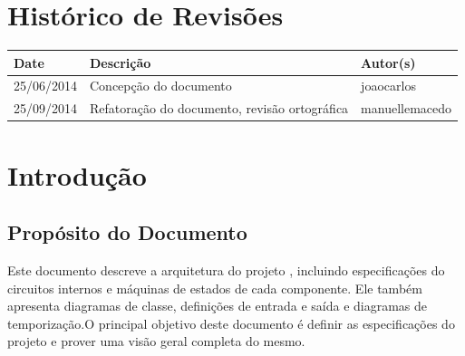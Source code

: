 \documentclass{report}
\begin{document}
\capa
%

\chapter*{Histórico de Revisões}
  \vspace*{1cm}
  \begin{table}[ht]
    \centering
    \begin{tabular}[pos]{|m{2cm} | m{8cm} | m{4cm}|} 
      \hline
      \cellcolor[gray]{0.9} \textbf{Date} & \cellcolor[gray]{0.9}\textbf{Descrição} & \cellcolor[gray]{0.9}\textbf{Autor(s)}\\
      \hline
      25/06/2014 &  Concepção do documento & joaocarlos \\ 
      \hline
      25/09/2014 &  Refatoração do documento, revisão ortográfica & manuellemacedo \\ 
      \hline
    \end{tabular}
  \end{table}

\tableofcontents

\chapter{Introdução}
  
  \section{Propósito do Documento}
  Este documento descreve a arquitetura do projeto \ipPROCESSProject, incluindo especificações do circuitos internos e máquinas de estados de cada componente. Ele também apresenta diagramas de classe, definições de entrada e saída e diagramas de temporização.O principal objetivo deste documento é definir as especificações do projeto \ipPROCESSProject e prover uma visão geral completa do mesmo.
\end{document}
